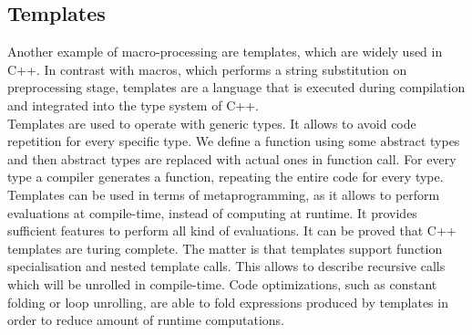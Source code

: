 \subsection{Templates}
Another example of macro-processing are templates, which are widely used in
C++. In contrast with macros, which performs a string substitution on
preprocessing stage, templates are a language that is executed during
compilation and integrated into the type system of C++. \\
Templates are used to operate with generic types. It allows to avoid code
repetition for every specific type. We define a function using some abstract
types and then abstract types are replaced with actual ones in function call.
For every type a compiler generates a function, repeating the entire code for
every type. \\ 
Templates can be used in terms of metaprogramming, as it allows to perform
evaluations at compile-time, instead of computing at runtime. It provides
sufficient features to perform all kind of evaluations. It can be proved that
C++ templates are turing complete\cite{veldhuizen}. The matter is that
templates support function specialisation and nested template calls. This
allows to describe recursive calls which will be unrolled in compile-time. Code
optimizations, such as constant folding or loop unrolling, are able to fold
expressions produced by templates in order to reduce amount of runtime
computations.
